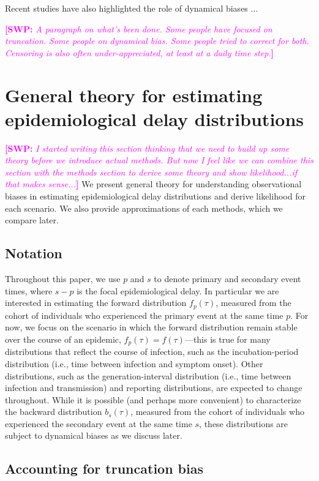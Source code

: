 \documentclass[12pt]{article}
\newcommand{\comment}{\showcomment}
\newcommand{\showcomment}[3]{\textcolor{#1}{\textbf{[#2: }\textsl{#3}\textbf{]}}}
\newcommand{\swp}[1]{\comment{magenta}{SWP}{#1}}
\begin{document}
Recent studies have also highlighted the role of dynamical biases ...

\swp{A paragraph on what's been done. Some people have focused on truncation. Some people on dynamical bias. Some people tried to correct for both. Censoring is also often under-appreciated, at least at a daily time step.}

\section{General theory for estimating epidemiological delay distributions}

\swp{I started writing this section thinking that we need to build up some theory before we introduce actual methods. But now I feel like we can combine this section with the methods section to derive some theory and show likelihood...if that makes sense...}
We present general theory for understanding observational biases in estimating epidemiological delay distributions and derive likelihood for each scenario.
We also provide approximations of each methods, which we compare later.

\subsection{Notation}

Throughout this paper, we use $p$ and $s$ to denote primary and secondary event times, where $s-p$ is the focal epidemiological delay.
In particular we are interested in estimating the forward distribution $f_p(\tau)$, measured from the cohort of individuals who experienced the primary event at the same time $p$.
For now, we focus on the scenario in which the forward distribution remain stable over the course of an epidemic, $f_p(\tau) = f(\tau)$---this is true for many distributions that reflect the course of infection, such as the incubation-period distribution (i.e., time between infection and symptom onset).
Other distributions, such as the generation-interval distribution (i.e., time between infection and transmission) and reporting distributions, are expected to change throughout.
While it is possible (and perhaps more convenient) to characterize the backward distribution $b_s(\tau)$, measured from the cohort of individuals who experienced the secondary event at the same time $s$, these distributions are subject to dynamical biases as we discuss later.

\subsection{Accounting for truncation bias}
\end{document}
